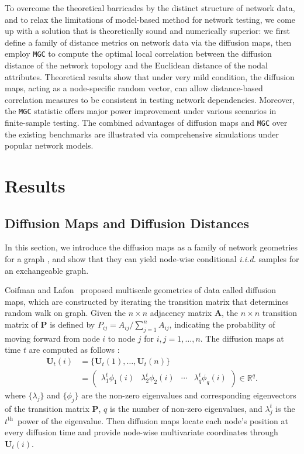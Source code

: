 \documentclass[11pt]{article}
\theoremstyle{definition}
\begin{document}
To overcome the theoretical barricades by the distinct structure of network data, and to relax the limitations of model-based method for network testing, we come up with a solution that is theoretically sound and numerically superior: we first define a family of distance metrics on network data via the diffusion maps, then employ \texttt{MGC} to compute the optimal local correlation between the diffusion distance of the network topology and the Euclidean distance of the nodal attributes. Theoretical results show that under very mild condition, the diffusion maps, acting as a node-specific random vector, can allow distance-based correlation measures to be consistent in testing network dependencies. Moreover, the \texttt{MGC} statistic offers major power improvement under various scenarios in finite-sample testing. The combined advantages of diffusion maps and \texttt{MGC} over the existing benchmarks are illustrated via comprehensive simulations under popular network models.

	\vspace*{-0.2cm}
\section{Results}
\label{sec:method}
	\vspace*{-0.2cm}
\subsection{Diffusion Maps and Diffusion Distances}
\label{ssec:method2}

In this section, we introduce the diffusion maps as a family of network geometries for a graph \cite{coifman2006diffusion}, and show that they can yield node-wise conditional \textit{i.i.d.} samples for an exchangeable graph.

Coifman and Lafon~\cite{coifman2006diffusion,lafon2006diffusion} proposed multiscale geometries of data called diffusion maps, which are constructed by iterating the transition matrix that determines random walk on graph. Given the $n \times n$ adjacency matrix $\mathbf{A}$, the $n \times n$ transition matrix of $\mathbf{P}$ is defined by $P_{ij} = A_{ij} /  \sum\limits_{j=1}^{n} A_{ij}$, indicating the probability of moving forward from node $i$ to node $j$ for $i,j = 1, \ldots , n$. The diffusion maps at time $t$ are computed as follows :
\begin{align*}
	\mathbf{U}_{t}(i) &=\{ \mathbf{U}_{t}(1) , \ldots, \mathbf{U}_{t}(n) \}\\
    &= \begin{pmatrix} \lambda^{t}_{1} \phi_{1}(i) & \lambda^{t}_{2} \phi_{2} (i)  & \cdots & \lambda^{t}_{q} \phi_{q}(i) \end{pmatrix} \in \mathbb{R}^{q}.
\end{align*}
where $\{ \lambda_{j} \}$ and $\{ \phi_{j}  \}$ are the non-zero eigenvalues and corresponding eigenvectors of the transition matrix $\mathbf{P}$, $q$ is the number of non-zero eigenvalues, and $\lambda^{t}_{j}$ is the $t^{\mbox{th}}$~power of the eigenvalue. Then diffusion maps locate each node's position at every diffusion time and provide node-wise multivariate coordinates through $\mathbf{U}_{t}(i)$. 
\end{document}
